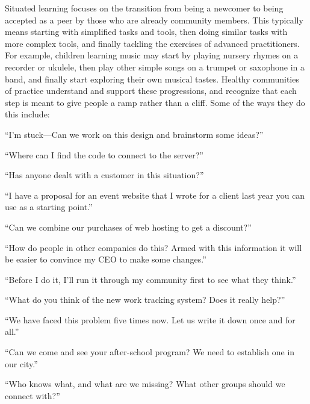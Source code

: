 Situated learning focuses on the transition from being a newcomer to
being accepted as a peer by those who are already community members.
This typically means starting with simplified tasks and tools, then
doing similar tasks with more complex tools, and finally tackling the
exercises of advanced practitioners. For example, children learning
music may start by playing nursery rhymes on a recorder or ukulele, then
play other simple songs on a trumpet or saxophone in a band, and finally
start exploring their own musical tastes. Healthy communities of
practice understand and support these progressions, and recognize that
each step is meant to give people a ramp rather than a cliff. Some of
the ways they do this include:

\begin{description}
\tightlist
\item[Problem solving:]
``I'm stuck---Can we work on this design and brainstorm some ideas?''
\item[Requests for information:]
``Where can I find the code to connect to the server?''
\item[Seeking experience:]
``Has anyone dealt with a customer in this situation?''
\item[Reusing assets:]
``I have a proposal for an event website that I wrote for a client
last year you can use as a starting point.''
\item[Coordination and synergy:]
``Can we combine our purchases of web hosting to get a discount?''
\item[Building an argument:]
``How do people in other companies do this? Armed with this
information it will be easier to convince my CEO to make some
changes.''
\item[Growing confidence:]
``Before I do it, I'll run it through my community first to see what
they think.''
\item[Discussing developments:]
``What do you think of the new work tracking system? Does it really
help?''
\item[Documenting projects:]
``We have faced this problem five times now. Let us write it down
once and for all.''
\item[Visits:]
``Can we come and see your after-school program? We need to establish
one in our city.''
\item[Mapping knowledge and identifying gaps:]
``Who knows what, and what are we missing? What other groups should
we connect with?''
\end{description}

